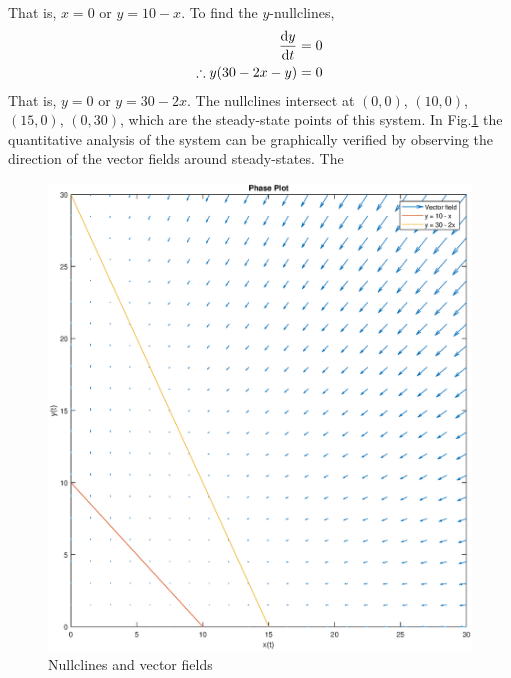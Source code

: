\documentclass[11pt,1in]{article}
\newenvironment{Example}[2][Example]{\begin{trivlist}
		\item[\hskip \labelsep {\bfseries #1}\hskip \labelsep {\bfseries #2.}]}{\end{trivlist}}
\begin{document}
\begin{Example}{1}
\begin{align*}
\end{align*}
That is, $x = 0$ or $y = 10 - x$. 
To find the $y$-nullclines,
\begin{align*}
\derivative{y}{t} &= 0\\
\therefore y(30 - 2x - y) &= 0
\end{align*}
That is, $y = 0$ or $y = 30 - 2x$. 
The nullclines intersect at $(0,0)$, $(10,0)$, $(15,0)$, $(0,30)$, which are the steady-state points of this system. In Fig.\ref{fig:example1} the quantitative analysis of the system can be graphically verified by observing the direction of the vector fields around steady-states. 
The 
\begin{figure}[H]
	\centering
	\includegraphics[width=\linewidth,height=.85\linewidth]{Figures/example_1}
	\caption{Nullclines and vector fields}
	\label{fig:example1}
\end{figure}

\end{Example}
\end{document}
